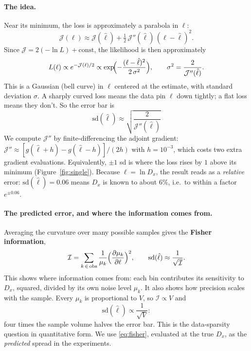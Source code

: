 \documentclass[11pt]{article}
\newcommand{\J}{\mathcal{J}}
\begin{document}
\paragraph{The idea.} Near its minimum, the loss is approximately a parabola in $\ell$:
\[
\J(\ell) \approx \J(\hat\ell) + \tfrac12\,\J''(\hat\ell)\,(\ell - \hat\ell)^2 .
\]
Since $\J = 2(-\ln L) + \text{const}$, the likelihood is then approximately
\[
L(\ell) \propto e^{-\J(\ell)/2} \propto \exp\!\Bigl(-\frac{(\ell - \hat\ell)^2}{2\,\sigma^2}\Bigr),\qquad \sigma^2 = \frac{2}{\J''(\hat\ell)} .
\]
This is a Gaussian (bell curve) in $\ell$ centered at the estimate, with standard deviation $\sigma$. A sharply curved loss means the data pin $\ell$ down tightly; a flat loss means they don't. So the error bar is
\begin{equation}\label{eq:sd}
\boxed{\;\mathrm{sd}(\hat\ell) \approx \sqrt{\frac{2}{\J''(\hat\ell)}}\;}
\end{equation}
We compute $\J''$ by finite-differencing the adjoint gradient: $\J''\approx[g(\hat\ell + h) - g(\hat\ell - h)]/(2h)$ with $h = 10^{-3}$, which costs two extra gradient evaluations. Equivalently, $\pm1$ sd is where the loss rises by $1$ above its minimum (Figure~\ref{fig:single}). Because $\ell = \ln D_x$, the result reads as a \emph{relative} error: $\mathrm{sd}(\hat\ell) = 0.06$ means $D_x$ is known to about $6\%$, i.e.\ to within a factor $e^{\pm0.06}$.

\paragraph{The predicted error, and where the information comes from.} Averaging the curvature over many possible samples gives the \textbf{Fisher information},
\begin{equation}\label{eq:fisher}
\mathcal{I} = \sum_{k\,\in\,\mathrm{obs}}\frac{1}{\mu_k}\Bigl(\frac{\partial\mu_k}{\partial\ell}\Bigr)^2,\qquad \mathrm{sd}(\hat\ell)\approx\frac{1}{\sqrt{\mathcal{I}}} .
\end{equation}
This shows where information comes from: each bin contributes its sensitivity to $D_x$, squared, divided by its own noise level $\mu_k$. It also shows how precision scales with the sample. Every $\mu_k$ is proportional to $V$, so $\mathcal{I}\propto V$ and
\[
\mathrm{sd}(\hat\ell)\propto\frac{1}{\sqrt V}:
\]
four times the sample volume halves the error bar. This is the data-sparsity question in quantitative form. We use \eqref{eq:fisher}, evaluated at the true $D_x$, as the \emph{predicted} spread in the experiments.
\end{document}
